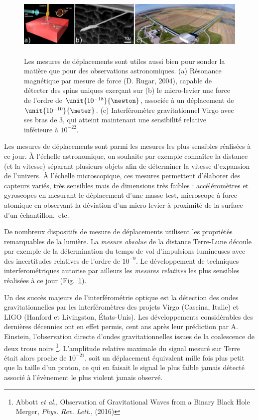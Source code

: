 \documentclass[12pt,a4paper]{article}
\begin{document}
\begin{figure}[b]
\center
\includegraphics[height=90pt]{figures/displacement.png}
\caption{Les mesures de déplacements sont utiles aussi bien pour sonder la matière que pour des observations astronomiques.
(a) Résonance magnétique par mesure de force (D. Rugar, 2004), capable de détecter des spins uniques exerçant sur (b) le micro-levier une force de l'ordre de $\unit{10^{-18}}{\newton}$, associée à un déplacement de $\unit{10^{-10}}{\meter}$.
(c) Interféromètre gravitationnel Virgo avec ses bras de \unit{3}{\kilo\meter}, qui atteint maintenant une sensibilité relative inférieure à $10^{-22}$.}
\label{fig:displacement_measurement}
\end{figure}

Les mesures de déplacements sont parmi les mesures les plus sensibles réalisées à ce jour.
À l'échelle astronomique, on souhaite par exemple connaître la distance (et la vitesse) séparant plusieurs objets afin de déterminer la vitesse d'expansion de l'univers.
À l'échelle microscopique, ces mesures permettent d'élaborer des capteurs variés, très sensibles mais de dimensions très faibles : accéléromètres et gyroscopes en mesurant le déplacement d'une masse test, microscope à force atomique en observant la déviation d'un micro-levier à proximité de la surface d'un échantillon,~etc.
 
De nombreux dispositifs de mesure de déplacements utilisent les propriétés remarquables de la lumière.
La \textit{mesure absolue} de la distance Terre-Lune découle par exemple de la détermination du temps de vol d'impulsions lumineuses avec des incertitudes relatives de l'ordre de $10^{-9}$.
Le développement de techniques interferométriques autorise par ailleurs les \textit{mesures relatives} les plus sensibles réalisées à ce jour (Fig.~\ref{fig:displacement_measurement}).

Un des succès majeurs de l'interférométrie optique est la détection des ondes gravitationnelles par les interféromètres des projets Virgo (Cascina, Italie) et LIGO (Hanford et Livingston, États-Unis).
Les développements considérables des dernières décennies ont en effet permis, cent ans après leur prédiction par A. Einstein, l'observation directe d'ondes gravitationnelles issues de la coalescence de deux trous noirs
\footnote{Abbott \textit{et al.}, Observation of Gravitational Waves from a Binary Black Hole Merger, \textit{Phys. Rev. Lett.}, (2016)}.
L'amplitude relative maximale du signal mesuré sur Terre était alors proche de $10^{-21}$, soit un déplacement équivalent mille fois plus petit que la taille d'un proton, ce qui en faisait le signal le plus faible jamais détecté associé à l'évènement le plus violent jamais observé.
\end{document}

